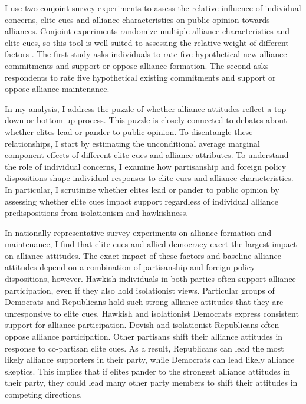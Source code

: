\documentclass[12pt]{article}
\begin{document}
I use two conjoint survey experiments to assess the relative influence of individual concerns, elite cues and alliance characteristics on public opinion towards alliances. 
Conjoint experiments randomize multiple alliance characteristics and elite cues, so this tool is well-suited to assessing the relative weight of different factors \citep{Hainmuelleretal2014}.
The first study asks individuals to rate five hypothetical new alliance commitments and support or oppose alliance formation.
The second asks respondents to rate five hypothetical existing commitments and support or oppose alliance maintenance. 


In my analysis, I address the puzzle of whether alliance attitudes reflect a top-down or bottom up process. 
This puzzle is closely connected to debates about whether elites lead or pander to public opinion. 
To disentangle these relationships, I start by estimating the unconditional average marginal component effects of different elite cues and alliance attributes.
To understand the role of individual concerns, I examine how partisanship and foreign policy dispositions shape individual responses to elite cues and alliance characteristics. 
In particular, I scrutinize whether elites lead or pander to public opinion by assessing whether elite cues impact support regardless of individual alliance predispositions from isolationism and hawkishness. 


In nationally representative survey experiments on alliance formation and maintenance, I find that elite cues and allied democracy exert the largest impact on alliance attitudes. 
The exact impact of these factors and baseline alliance attitudes depend on a combination of partisanship and foreign policy dispositions, however. 
Hawkish individuals in both parties often support alliance participation, even if they also hold isolationist views.
Particular groups of Democrats and Republicans hold such strong alliance attitudes that they are unresponsive to elite cues.
Hawkish and isolationist Democrats express consistent support for alliance participation.
Dovish and isolationist Republicans often oppose alliance participation. 
Other partisans shift their alliance attitudes in response to co-partisan elite cues. 
As a result, Republicans can lead the most likely alliance supporters in their party, while Democrats can lead likely alliance skeptics. 
This implies that if elites pander to the strongest alliance attitudes in their party, they could lead many other party members to shift their attitudes in competing directions. 
\end{document}
